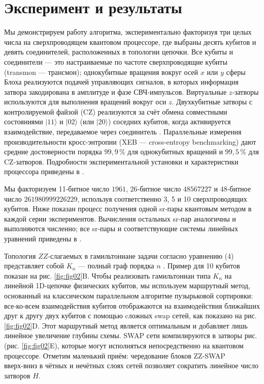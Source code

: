 \section{Эксперимент и результаты}

Мы демонстрируем работу алгоритма, экспериментально факторизуя три целых числа
на сверхпроводящем квантовом процессоре, где выбраны десять кубитов и девять
соединителей, расположенных в топологии цепочки. Все кубиты и соединители — это
настраиваемые по частоте сверхпроводящие кубиты (transmon --- трансмон);
однокубитные вращения вокруг осей $x$ или $y$ сферы Блоха реализуются подачей
управляющих сигналов, в которых информация затвора закодирована в амплитуде и
фазе СВЧ‑импульсов. Виртуальные $z$‑затворы используются для выполнения
вращений вокруг оси $z$. Двухкубитные затворы с контролируемой файзой (CZ)
реализуются за счёт обмена совместными состояниями $|11\rangle$ и $|02\rangle$
(или $|20\rangle$) соседних кубитов, когда активируется взаимодействие,
передаваемое через соединитель \cite{cite_34}. Параллельные измерения
производительности кросс-энтропии (XEB --- cross-entropy benchmarking) дают
средние достоверности порядка $99{,}9\,\%$ для однокубитных вращений и
$99{,}5\,\%$ для CZ‑затворов. Подробности экспериментальной установки и
характеристики процессора приведены в \cite{cite_31}.

Мы факторизуем 11‑битное число $1961$, 26‑битное число $48567227$ и 48‑битное
число $261980999226229$, используя соответственно 3, 5 и 10 сверхпроводящих
кубитов. Ниже показан процесс получения одной sr‑пары квантовым методом в
каждой серии экспериментов. Вычисления остальных sr‑пар аналогичны и
выполняются численно; все sr‑пары и соответствующие системы линейных уравнений
приведены в \cite{cite_31}.

Топология $ZZ$‑слагаемых в гамильтониане задачи согласно уравнению (4)
представляет собой $K_n$ --- полный граф порядка $n$ \cite{cite_31}. Пример для
10 кубитов показан на рис. \ref{fig:fig02}B. Чтобы реализовать гамильтониан
типа $K_n$ на линейной 1D-цепочке физических кубитов, мы используем маршрутный
метод, основанный на классическом параллельном алгоритме пузырьковой
сортировки: все‑ко‑всем взаимодействия кубитов отображаются на взаимодействия
ближайших друг к другу двух кубитов с помощью cложных swap сетей, как показано
на рис. \ref{fig:fig02}D. Этот маршрутный метод является оптимальным и
добавляет лишь линейное увеличение глубины схемы. SWAP сети компилируются в
затворы рис. (рис. \ref{fig:fig02}E), которые могут исполняться непосредственно
на квантовом процессоре. Отметим маленький приём: чередование блоков ZZ‑SWAP
вверх‑вниз в чётных и нечётных слоях сетей позволяет сократить линейное число
затворов $H$.

